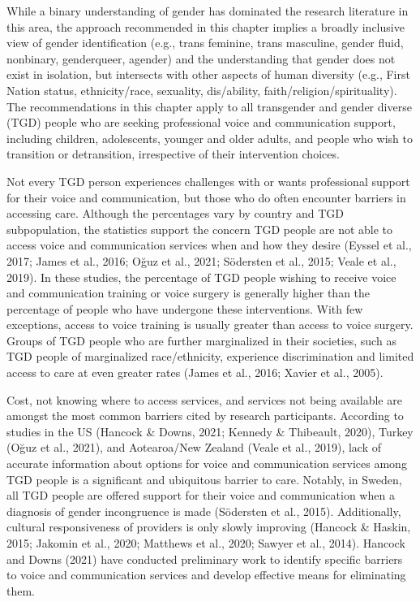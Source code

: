 \documentclass[
]{book}
\begin{document}
While a binary understanding of gender has
dominated the research literature in this area, the
approach recommended in this chapter implies
a broadly inclusive view of gender identification
(e.g., trans feminine, trans masculine, gender
fluid, nonbinary, genderqueer, agender) and the
understanding that gender does not exist in isolation, but intersects with other aspects of human
diversity (e.g., First Nation status, ethnicity/race,
sexuality, dis/ability, faith/religion/spirituality).
The recommendations in this chapter apply to
all transgender and gender diverse (TGD) people
who are seeking professional voice and communication support, including children, adolescents,
younger and older adults, and people who wish
to transition or detransition, irrespective of their
intervention choices.

Not every TGD person experiences challenges
with or wants professional support for their voice
and communication, but those who do often
encounter barriers in accessing care. Although
the percentages vary by country and TGD subpopulation, the statistics support the concern
TGD people are not able to access voice and
communication services when and how they
desire (Eyssel et al., 2017; James et al., 2016;
Oğuz et al., 2021; Södersten et al., 2015; Veale
et al., 2019). In these studies, the percentage of
TGD people wishing to receive voice and
communication training or voice surgery is generally higher than the percentage of people who
have undergone these interventions. With few
exceptions, access to voice training is usually
greater than access to voice surgery. Groups of
TGD people who are further marginalized in
their societies, such as TGD people of marginalized race/ethnicity, experience discrimination
and limited access to care at even greater rates
(James et al., 2016; Xavier et al., 2005).

Cost, not knowing where to access services,
and services not being available are amongst the
most common barriers cited by research participants. According to studies in the US (Hancock
\& Downs, 2021; Kennedy \& Thibeault, 2020),
Turkey (Oğuz et al., 2021), and Aotearoa/New
Zealand (Veale et al., 2019), lack of accurate
information about options for voice and communication services among TGD people is a significant and ubiquitous barrier to care. Notably, in
Sweden, all TGD people are offered support for
their voice and communication when a diagnosis
of gender incongruence is made (Södersten et al.,
2015). Additionally, cultural responsiveness of
providers is only slowly improving (Hancock \&
Haskin, 2015; Jakomin et al., 2020; Matthews
et al., 2020; Sawyer et al., 2014). Hancock and
Downs (2021) have conducted preliminary work
to identify specific barriers to voice and communication services and develop effective means for
eliminating them.
\end{document}
